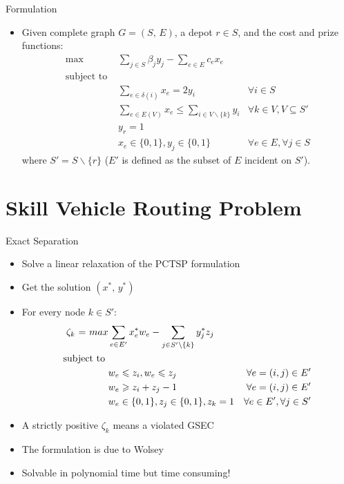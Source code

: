 \documentclass[10pt]{beamer}
\begin{document}
\begin{frame}[fragile]{Formulation}
\begin{itemize}
\item<1-> Given complete graph $G = (S, \, E)$, a depot $r \in S$, and the cost and prize functions:
\begin{align} 
\text {max } \label{sp_obj}     & \sum_{j\in S} \beta_j y_j  - \sum_{e\in E} c_e x_e &
 \\
\text{subject to } \nonumber    &  & \\
\label{const:sp1}               & \sum_{e \in \delta(i)} x_e = 2 y_{i}  & \forall i \in S \\
\label{const:sp2}               & \sum_{e \in E(V) } x_e \leq \sum_{i \in V \backslash\{ k \}} y_{i} & \forall k \in V, V\subseteq S' \\
\label{const:sp3}               & y_r = 1 \\
\label{const:sp4}               & x_e \in \{0,1\}, y_j \in \{0,1\}  & \forall e \in E, \forall j \in S 
\end{align}
where $S' = S \backslash \{r\}$ ($E'$ is defined as the subset of $E$ incident on $S'$).
\end{itemize}
\end{frame}

\section{Skill Vehicle Routing Problem}

\begin{frame}[fragile]{Exact Separation}
\begin{itemize}
\item<1-> Solve a linear relaxation of the PCTSP formulation
\item<2-> Get the solution $(x^*, \, y^*)$ 
\item<3-> For every node $k \in S'$:
\begin{align} 
\zeta_k \ \text  = \ {max } \label{sep_obj} & \sum_{e\in E'} x_e^{*} w_e  - \sum_{j \in S' \backslash \{ k \}}  y_j^{*} z_j     &  \\
\text{subject to }                          & & \nonumber \\
\label{const:sep1}                          & w_e\leq z_i, w_e\leq z_j  & \forall e =(i,j) \in E' \\
\label{const:sep2}                          & w_e \geq z_i + z_j - 1    & \forall e = (i,j) \in E' \\
\label{const:sep3}                          & w_e \in \{0,1\}, z_j \in \{0,1\}, z_k = 1   & \forall e \in E', \forall j \in S'
\end{align}
\item<4-> A strictly positive $\zeta_k$ means a violated GSEC
\item<5-> The formulation is due to Wolsey \cite{Wolsey98}
\item<6-> Solvable in polynomial time but \alert{time consuming!}
\end{itemize}
\end{frame}
\end{document}
